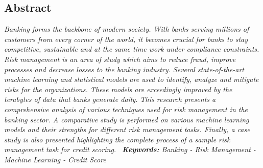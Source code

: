 \documentclass[a4paper, 12pt]{article}
\begin{document}
\newpage
\begin{center}
\section*{\centering Abstract}
\end{center}
\textit{
{\fontsize{10pt}{10pt}\selectfont Banking forms the backbone of modern society. With banks serving millions of customers from every corner of the world, it becomes crucial for banks to stay competitive, sustainable and at the same time work under compliance constraints. Risk management is an area of study which aims to reduce fraud, improve processes and decrease losses to the banking industry. Several state-of-the-art machine learning and statistical models are used to identify, analyze and mitigate risks for the organizations. These models are exceedingly improved by the terabytes of data that banks generate daily. This research presents a comprehensive analysis of various techniques used for risk management in the banking sector. A comparative study is performed on various machine learning models and their strengths for different risk management tasks. Finally, a case study is also presented highlighting the complete process of a sample risk management task for credit scoring.
}
}
\vskip 0.1in
\noindent\
\emph{
{\fontsize{10pt}{10pt}\selectfont \textbf{Keywords:}  Banking - Risk Management - Machine Learning - Credit Score}}
\end{document}
